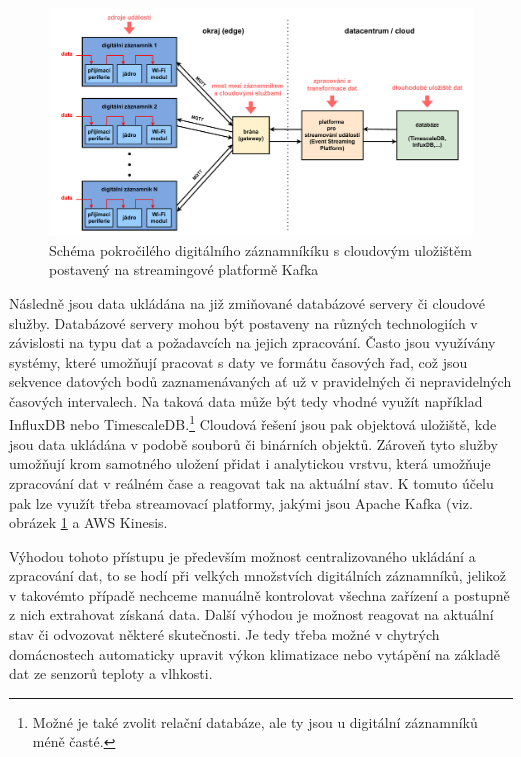 \begin{figure}[h]
    \centering
    \includegraphics[width=1.00\textwidth]{obrazky-figures/advanced_architecture_of_datalogging.pdf}
    
    \caption{Schéma pokročilého digitálního záznamníkíku s cloudovým uložištěm postavený na streamingové platformě Kafka \cite{confluent_advanced_datalogging, influxdata_advanced_datalogging_mmqt}}
    \label{fig:advanced-architecture-of-datalogging}
\end{figure}


Následně jsou data ukládána na již zmiňované databázové servery či cloudové služby. Databázové servery mohou být postaveny na různých technologiích v závislosti na typu dat a požadavcích na jejich zpracování. Často jsou využívány systémy, které umožňují pracovat s daty ve formátu časových řad, což jsou sekvence datových bodů zaznamenávaných ať už v pravidelných či nepravidelných časových intervalech. Na taková data může být tedy vhodné využít například InfluxDB nebo TimescaleDB.\footnote{Možné je také zvolit relační databáze, ale ty jsou u digitální záznamníků méně časté.} Cloudová řešení jsou pak objektová uložiště, kde jsou data ukládána v podobě souborů či binárních objektů. Zároveň tyto služby umožňují krom samotného uložení přidat i analytickou vrstvu, která umožňuje zpracování dat v reálném čase a reagovat tak na aktuální stav. K tomuto účelu pak lze využít třeba streamovací platformy, jakými jsou Apache Kafka (viz. obrázek \ref{fig:advanced-architecture-of-datalogging} a AWS Kinesis. \cite{springer_analysis_time_series_db_edge_computing}

Výhodou tohoto přístupu je především možnost centralizovaného ukládání a zpracování dat, to se hodí při velkých množstvích digitálních záznamníků, jelikož v takovémto případě nechceme manuálně kontrolovat všechna zařízení a postupně z nich extrahovat získaná data. Další výhodou je možnost reagovat na aktuální stav či odvozovat některé skutečnosti. Je tedy třeba možné v chytrých domácnostech automaticky upravit výkon klimatizace nebo vytápění na základě dat ze senzorů teploty a vlhkosti. \cite{springer_analysis_time_series_db_edge_computing}

